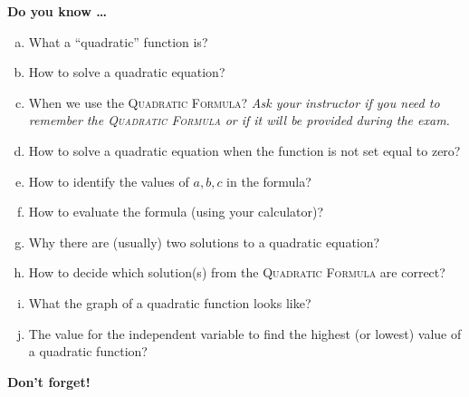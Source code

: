 \newpage



\bigskip

\noindent \textbf{Do you know \ldots} %

\begin{enumerate} [(a)]
\item What a ``quadratic'' function is? 
\item How to solve a quadratic equation? 
\item When we use the \textsc{Quadratic Formula}?   \emph{Ask your instructor if you need to remember the \textsc{Quadratic Formula} or if it will be provided during the exam.}
\item How to solve a quadratic equation when the function is not set equal to zero? 
\item How to identify the values of $a, b, c$ in the formula? 
\item How to evaluate the formula (using your calculator)?   \item Why there are (usually) two solutions to a quadratic equation? 
\item How to decide which solution(s) from the \textsc{Quadratic Formula} are correct? 
\item What the graph of a quadratic function looks like? 
\item The value for the independent variable to find  the highest (or lowest) value of a quadratic function? 
\end{enumerate}

\bigskip

\noindent \textbf{Don't forget!}
